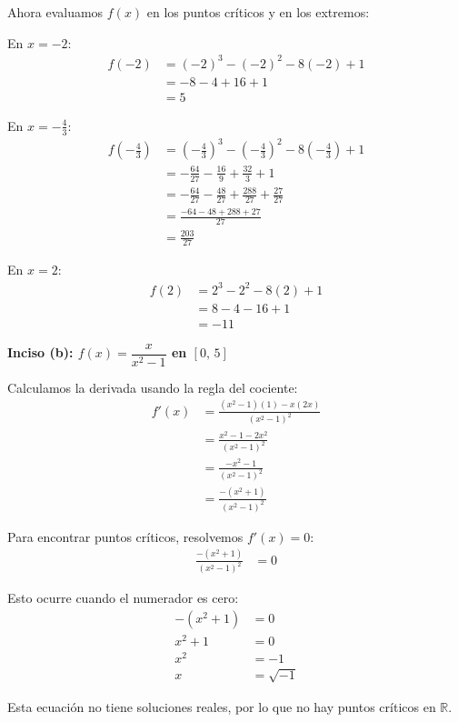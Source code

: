 \documentclass{article}
\begin{document}
Ahora evaluamos $f(x)$ en los puntos críticos y en los extremos:

En $x = -2$:
\begin{align}
f(-2) &= (-2)^{3} - (-2)^{2} - 8(-2) + 1 \\
&= -8 - 4 + 16 + 1 \\
&= 5
\end{align}

En $x = -\frac{4}{3}$:
\begin{align}
f\left(-\frac{4}{3}\right) &= \left(-\frac{4}{3}\right)^{3} - \left(-\frac{4}{3}\right)^{2} - 8\left(-\frac{4}{3}\right) + 1 \\
&= -\frac{64}{27} - \frac{16}{9} + \frac{32}{3} + 1 \\
&= -\frac{64}{27} - \frac{48}{27} + \frac{288}{27} + \frac{27}{27} \\
&= \frac{-64 - 48 + 288 + 27}{27} \\
&= \frac{203}{27}
\end{align}

En $x = 2$:
\begin{align}
f(2) &= 2^{3} - 2^{2} - 8(2) + 1 \\
&= 8 - 4 - 16 + 1 \\
&= -11
\end{align}


\textbf{Inciso (b): $f(x) = \dfrac{x}{x^{2}-1}$ en $[0,\,5]$}

Calculamos la derivada usando la regla del cociente:
\begin{align}
f'(x) &= \frac{(x^{2}-1)(1) - x(2x)}{(x^{2}-1)^{2}} \\
&= \frac{x^{2} - 1 - 2x^{2}}{(x^{2}-1)^{2}} \\
&= \frac{-x^{2} - 1}{(x^{2}-1)^{2}} \\
&= \frac{-(x^{2} + 1)}{(x^{2}-1)^{2}}
\end{align}

Para encontrar puntos críticos, resolvemos $f'(x) = 0$:
\begin{align}
\frac{-(x^{2} + 1)}{(x^{2}-1)^{2}} &= 0
\end{align}

Esto ocurre cuando el numerador es cero:
\begin{align}
-(x^{2} + 1) &= 0 \\
x^{2} + 1 &= 0 \\
x^{2} &= -1 \\
x &= \sqrt{-1}
\end{align}

Esta ecuación no tiene soluciones reales, por lo que no hay puntos críticos en $\mathbb{R}$.
\end{document}
